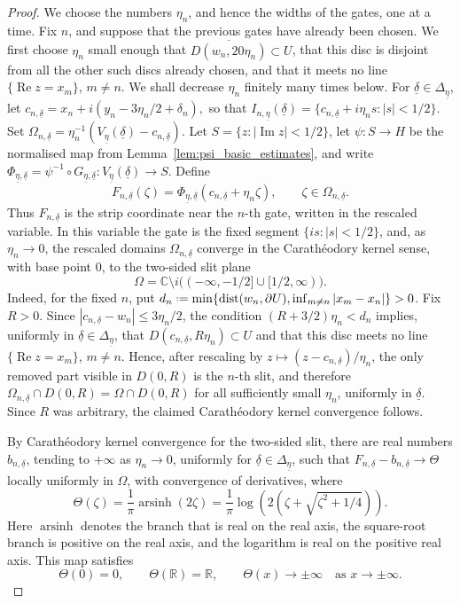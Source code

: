 \documentclass[a4paper, 11pt, reqno]{amsart}
\numberwithin{equation}{section}
\theoremstyle{plain}
\newcommand*{\defeq}{\mathrel{\vcenter{\baselineskip0.5ex \lineskiplimit0pt
 \hbox{\scriptsize.}\hbox{\scriptsize.}}}=}
\theoremstyle{remark}
\newcommand{\C}{{\mathbb{C}}}
\newcommand{\R}{{\mathbb{R}}}
\newcommand{\uldelta}{\underline{\delta}}
\newcommand{\uleta}{\underline{\eta}}
\newcommand{\Rea}{\operatorname{Re }}
\newcommand{\Ima}{\operatorname{Im }}
\newcommand{\dist}{\operatorname{dist}}
\begin{document}
\begin{proof}
	We choose the numbers \(\eta_n\), and hence the widths of the gates, one at a time. Fix \(n\), and suppose that the previous
	gates have already been chosen. We first choose \(\eta_n\) small enough that
	\(\overline{D(w_n,20\eta_n)}\subset U\), that this disc is disjoint from all
	the other such discs already chosen, and that it meets no line
	\(\{\Rea z=x_m\}\), \(m\ne n\). We shall decrease \(\eta_n\) finitely many
	times below. For \(\uldelta\in\Delta_{\uleta}\), let
	$
	c_{n,\uldelta}
	=
	x_n+i(y_n-3\eta_n/2+\delta_n),
	$
	so that
	$
	I_{n,\uleta}(\uldelta)
	=
	\{c_{n,\uldelta}+i\eta_ns:|s|<1/2\}.
	$
	Set
	$
	\Omega_{n,\uldelta}
	=
	\eta_n^{-1}(V_{\uleta}(\uldelta)-c_{n,\uldelta}).
	$
	Let \(S=\{z:|\Ima z|<1/2\}\), let \(\psi:S\to H\) be the normalised map from
	Lemma~\ref{lem:psi_basic_estimates}, and write
	$
	\Phi_{\uleta,\uldelta}
	=
	\psi^{-1}\circ G_{\uleta,\uldelta}
	:
	V_{\uleta}(\uldelta)\to S .
	$
	Define
	\[
	F_{n,\uldelta}(\zeta)
	=
	\Phi_{\uleta,\uldelta}(c_{n,\uldelta}+\eta_n\zeta),
	\qquad
	\zeta\in\Omega_{n,\uldelta}.
	\]
	Thus \(F_{n,\uldelta}\) is the strip coordinate near the \(n\)-th gate,
	written in the rescaled variable. In this variable the gate is the fixed
	segment \(\{is:|s|<1/2\}\), and, as \(\eta_n\to0\), the rescaled domains
	\(\Omega_{n,\uldelta}\) converge in the Carath\'eodory kernel sense, with base point \(0\), to the two-sided slit plane
	\[
	\Omega
	=
	\C\setminus i\bigl((-\infty,-1/2]\cup[1/2,\infty)\bigr).
	\]
	Indeed, for the fixed \(n\), put
		\(d_n\defeq\min\{\dist(w_n,\partial U),\inf_{m\ne n}|x_m-x_n|\}>0\).
		Fix \(R>0\). Since \(|c_{n,\uldelta}-w_n|\le 3\eta_n/2\), the condition
		\((R+3/2)\eta_n<d_n\) implies, uniformly in
		\(\uldelta\in\Delta_{\uleta}\), that \(D(c_{n,\uldelta},R\eta_n)\subset U\)
		and that this disc meets no line \(\{\Rea z=x_m\}\), \(m\ne n\). Hence, after
		rescaling by \(z\mapsto (z-c_{n,\uldelta})/\eta_n\), the only removed part
		visible in \(D(0,R)\) is the \(n\)-th slit, and therefore
		\(\Omega_{n,\uldelta}\cap D(0,R)=\Omega\cap D(0,R)\) for all sufficiently
		small \(\eta_n\), uniformly in \(\uldelta\). Since \(R\) was arbitrary, the
		claimed Carath\'eodory kernel convergence follows.
	
	By Carath\'eodory kernel convergence for the two-sided slit, there are real
	numbers \(b_{n,\uldelta}\), tending to \(+\infty\) as \(\eta_n\to0\),
	uniformly for \(\uldelta\in\Delta_{\uleta}\), such that
	$
	F_{n,\uldelta}-b_{n,\uldelta}
	\longrightarrow
	\Theta
	$
	locally uniformly in \(\Omega\), with convergence of derivatives, where
	\[
	\Theta(\zeta)=
	\frac1\pi\operatorname{arsinh}(2\zeta)
	=
	\frac1\pi
	\log\left(2\left(\zeta+\sqrt{\zeta^2+1/4}\right)\right).
	\]
	Here \(\operatorname{arsinh}\) denotes the branch that is real on the real axis, the square-root branch is positive on the real axis, and the logarithm is real on the positive real axis. This map satisfies
	\[
	\Theta(0)=0,\qquad \Theta(\R)=\R,
	\qquad
	\Theta(x)\to\pm\infty
	\quad\text{as }x\to\pm\infty .
	\]
	

\end{proof}
\end{document}
